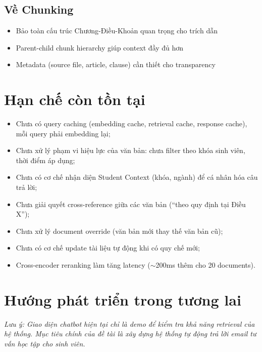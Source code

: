 \documentclass[../DoAn.tex]{subfiles}
\begin{document}
\subsection{Về Chunking}
\begin{itemize}
    \item Bảo toàn cấu trúc Chương-Điều-Khoản quan trọng cho trích dẫn
    \item Parent-child chunk hierarchy giúp context đầy đủ hơn
    \item Metadata (source file, article, clause) cần thiết cho transparency
\end{itemize}

\section{Hạn chế còn tồn tại}

\begin{itemize}
    \item Chưa có query caching (embedding cache, retrieval cache, response cache), mỗi query phải embedding lại;
    \item Chưa xử lý phạm vi hiệu lực của văn bản: chưa filter theo khóa sinh viên, thời điểm áp dụng;
    \item Chưa có cơ chế nhận diện Student Context (khóa, ngành) để cá nhân hóa câu trả lời;
    \item Chưa giải quyết cross-reference giữa các văn bản (``theo quy định tại Điều X'');
    \item Chưa xử lý document override (văn bản mới thay thế văn bản cũ);
    \item Chưa có cơ chế update tài liệu tự động khi có quy chế mới;
    \item Cross-encoder reranking làm tăng latency ($\sim$200ms thêm cho 20 documents).
\end{itemize}

\section{Hướng phát triển trong tương lai}

\textit{Lưu ý: Giao diện chatbot hiện tại chỉ là demo để kiểm tra khả năng retrieval của hệ thống. Mục tiêu chính của đề tài là xây dựng hệ thống tự động trả lời email tư vấn học tập cho sinh viên.}
\end{document}
